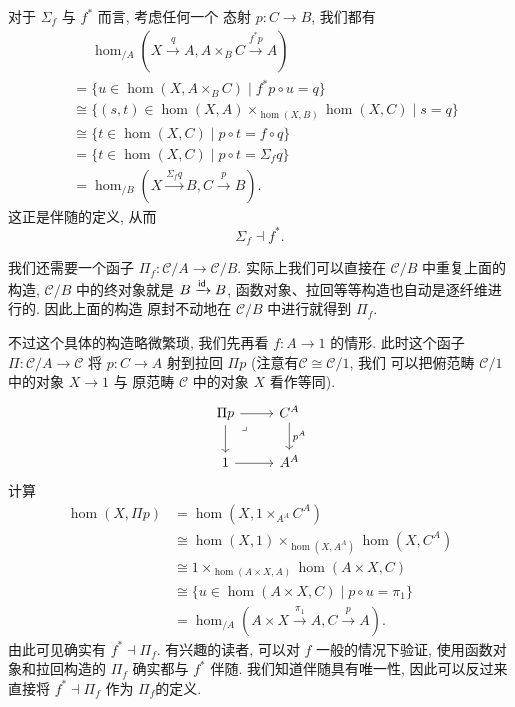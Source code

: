 对于 \(\Sigma_f\) 与 \(f^*\) 而言, 考虑任何一个
态射 \(p : C \to B\), 我们都有
\[\begin{aligned}
&\phantom{\cong{}}
\hom_{/A}(X\xrightarrow{q} A, A\times_B C\xrightarrow{f^* p} A)\\
&= \{ u \in \hom(X, A\times_B C) \mid f^*p\circ u = q\}\\
&\cong \{ (s,t) \in \hom(X, A) \times_{\hom(X, B)} \hom(X, C) \mid s = q\}\\
&\cong \{t \in \hom(X, C) \mid p\circ t = f \circ q\}\\
&= \{t \in \hom(X, C) \mid p\circ t = \Sigma_f q\}\\
&= \hom_{/B}(X \xrightarrow{\Sigma_f q} B, C \xrightarrow{p} B).
\end{aligned}\]
这正是伴随的定义, 从而
\[\Sigma_f \dashv f^*.\]

我们还需要一个函子 \(\Pi_f : \mathcal C/A \to \mathcal C/B\).
实际上我们可以直接在 \(\mathcal C/B\) 中重复上面的构造,
\(\mathcal C/B\) 中的终对象就是 \(B\xrightarrow{\textnormal{\textsf{id}}}B\),
函数对象、拉回等等构造也自动是逐纤维进行的. 因此上面的构造
原封不动地在 \(\mathcal C/B\) 中进行就得到 \(\Pi_f\).

不过这个具体的构造略微繁琐, 我们先再看 \(f : A\to 1\) 的情形.
此时这个函子 \(\Pi : \mathcal C/A \to 
\mathcal C\) 将 \(p : C \to A\) 射到拉回 \(\Pi p\)
(注意有\(\mathcal C \cong \mathcal C/1\), 我们
可以把俯范畴 \(\mathcal C/1\) 中的对象 \(X \to 1\) 与
原范畴 \(\mathcal C\) 中的对象 \(X\) 看作等同).
\[\begin{tikzcd}
  {\Pi p} & {C^A} \\
  1 & {A^A}
  \arrow["{p^A}", from=1-2, to=2-2]
  \arrow[from=2-1, to=2-2]
  \arrow[from=1-1, to=2-1]
  \arrow[from=1-1, to=1-2]
  \arrow["\lrcorner"{anchor=center, pos=0.125}, draw=none, from=1-1, to=2-2]
\end{tikzcd}\]
计算
\[\begin{aligned}
\hom(X, \Pi p)
&= \hom(X, 1 \times_{A^A} C^A)\\
&\cong \hom(X, 1) \times_{\hom(X, A^A)} \hom(X, C^A)\\
&\cong 1 \times_{\hom(A \times X, A)} \hom(A\times X, C)\\
&\cong \{u \in \hom(A \times X, C)
  \mid p \circ u = \pi_1\}\\
&= \hom_{/A}(A \times X \xrightarrow{\pi_1} A, C \xrightarrow p A).
\end{aligned}\]
由此可见确实有 \(f^* \dashv \Pi_f\). 有兴趣的读者,
可以对 \(f\) 一般的情况下验证, 使用函数对象和拉回构造的
\(\Pi_f\) 确实都与 \(f^*\) 伴随. 我们知道伴随具有唯一性,
因此可以反过来直接将 \(f^* \dashv \Pi_f\) 作为
\(\Pi_f\)的定义.

